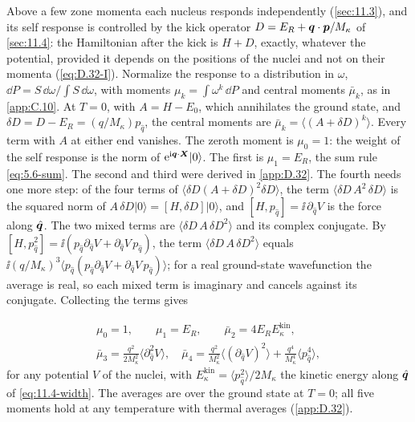 Above a few zone momenta each nucleus responds independently (\cref{sec:11.3}), and its self response is controlled by the kick operator $D = E_R + \bm{q}\cdot\bm{p}/M_\kappa$ of \cref{sec:11.4}: the Hamiltonian after the kick is $H + D$, exactly, whatever the potential, provided it depends on the positions of the nuclei and not on their momenta (\cref{eq:D.32-I}). Normalize the response to a distribution in $\omega$, $\dd P = S\,\dd\omega/\int S\,\dd\omega$, with moments $\mu_k = \int\omega^k\,\dd P$ and central moments $\bar\mu_k$, as in \cref{app:C.10}. At $T = 0$, with $A = H - E_0$, which annihilates the ground state, and $\delta D = D - E_R = (q/M_\kappa)p_{\hat q}$, the central moments are $\bar\mu_k = \langle(A + \delta D)^k\rangle$. Every term with $A$ at either end vanishes. The zeroth moment is $\mu_0 = 1$: the weight of the self response is the norm of $\mathrm{e}^{\mathrm{i}\bm{q}\cdot\bm{X}}|0\rangle$. The first is $\mu_1 = E_R$, the sum rule \cref{eq:5.6-sum}. The second and third were derived in \cref{app:D.32}. The fourth needs one more step: of the four terms of $\langle\delta D(A + \delta D)^2\delta D\rangle$, the term $\langle\delta D\,A^2\,\delta D\rangle$ is the squared norm of $A\,\delta D|0\rangle = [H, \delta D]|0\rangle$, and $[H, p_{\hat q}] = \ii\,\partial_{\hat q}V$ is the force along $\hat{\bm{q}}$. The two mixed terms are $\langle\delta D\,A\,\delta D^2\rangle$ and its complex conjugate. By $[H, p_{\hat q}^2] = \ii(p_{\hat q}\partial_{\hat q}V + \partial_{\hat q}V\,p_{\hat q})$, the term $\langle\delta D\,A\,\delta D^2\rangle$ equals $\ii(q/M_\kappa)^3\langle p_{\hat q}(p_{\hat q}\partial_{\hat q}V + \partial_{\hat q}V\,p_{\hat q})\rangle$; for a real ground-state wavefunction the average is real, so each mixed term is imaginary and cancels against its conjugate. Collecting the terms gives
\begin{keyresult}
\begin{equation}
  \begin{gathered}
  \mu_0 = 1 , \qquad \mu_1 = E_R , \qquad
  \bar\mu_2 = 4E_RE^{\mathrm{kin}}_\kappa , \\
  \bar\mu_3 = \frac{q^2}{2M_\kappa^2}\bigl\langle\partial_{\hat q}^2V\bigr\rangle , \quad
  \bar\mu_4 = \frac{q^2}{M_\kappa^2}\bigl\langle(\partial_{\hat q}V)^2\bigr\rangle + \frac{q^4}{M_\kappa^4}\bigl\langle p_{\hat q}^4\bigr\rangle ,
  \end{gathered}
  \label{eq:11.5-moments}
\end{equation}
for any potential $V$ of the nuclei, with $E^{\mathrm{kin}}_\kappa = \langle p_{\hat q}^2\rangle/2M_\kappa$ the kinetic energy along $\hat{\bm{q}}$ of \cref{eq:11.4-width}. The averages are over the ground state at $T = 0$; all five moments hold at any temperature with thermal averages (\cref{app:D.32}).
\end{keyresult}
